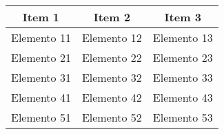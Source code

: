 \documentclass[x11names,table]{article}
\begin{document}

\begin{tabular}{ccc}
  \rowcolor{red!17} {\bf Item 1} & {\bf Item 2} & {\bf Item 3} \\ \hline
  Elemento 11 & Elemento 12 & Elemento 13 \\ \hline
  Elemento 21 & Elemento 22 & Elemento 23 \\ \hline
  Elemento 31 & Elemento 32 & Elemento 33 \\ \hline
  Elemento 41 & Elemento 42 & Elemento 43 \\ \hline
  Elemento 51 &\cellcolor{black!15} Elemento 52 & Elemento 53 \\ \hline
\end{tabular}
\end{document}
